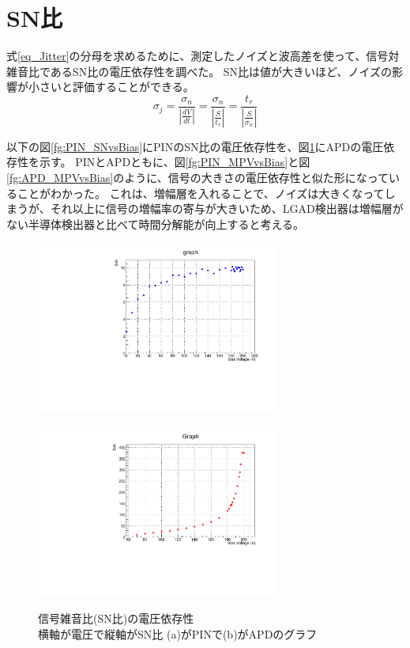 \section{SN比}
式\ref{eq_Jitter}の分母を求めるために、測定したノイズと波高差を使って、信号対雑音比であるSN比の電圧依存性を調べた。
SN比は値が大きいほど、ノイズの影響が小さいと評価することができる。
\begin{equation}
    \sigma_j = \frac{\sigma_n}{\left|\frac{dV}{dt}\right|} = \frac{\sigma_n}{\left|\frac{S}{t_r}\right|} = \frac{t_r}{\left|\frac{S}{\sigma_n}\right|}
    \label{eq_Jitter}
\end{equation}

以下の図\ref{fg:PIN_SNvsBias}にPINのSN比の電圧依存性を、図\ref{fg:APD_SNvsBias}にAPDの電圧依存性を示す。
PINとAPDともに、図\ref{fg:PIN_MPVvsBias}と図\ref{fg:APD_MPVvsBias}のように、信号の大きさの電圧依存性と似た形になっていることがわかった。
これは、増幅層を入れることで、ノイズは大きくなってしまうが、それ以上に信号の増幅率の寄与が大きいため、LGAD検出器は増幅層がない半導体検出器と比べて時間分解能が向上すると考える。

\begin{figure}[h]
    \begin{minipage}[b]{0.5\linewidth}
        \centering
        \includegraphics[width=8cm]{fig/graph/SN_pad1ch_PIN_ver2_temp_126_20231220.pdf}
        \label{fg:PIN_SNvsBias}
    \end{minipage}
    \begin{minipage}[b]{0.5\linewidth}
        \centering
        \includegraphics[width=8cm]{fig/graph/SN_pad1ch_APD_ver2_temp_126_20231220.pdf}
        \label{fg:APD_SNvsBias}
    \end{minipage}
    \caption{信号雑音比(SN比)の電圧依存性\\横軸が電圧で縦軸がSN比  (a)がPINで(b)がAPDのグラフ}
\end{figure}


